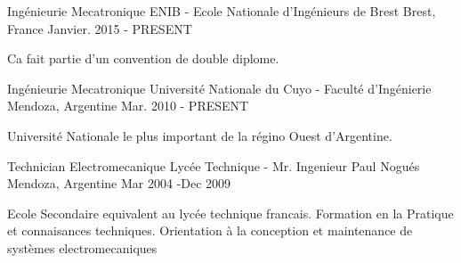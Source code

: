 

\begin{cventries}

  \cventry
    {Ingénieurie Mecatronique} %
    {ENIB - Ecole Nationale d'Ingénieurs de Brest} %
    {Brest, France} %
    {Janvier. 2015 - PRESENT} %
    {
      \begin{cvitems} %
        \item {Ca fait partie d'un convention de double diplome.}
      \end{cvitems}
    }


\cventry
{Ingénieurie Mecatronique} %
{Université Nationale du Cuyo - Faculté d'Ingénierie} %
{Mendoza, Argentine} %
{Mar. 2010 - PRESENT} %
{
	\begin{cvitems} %
		\item {Université Nationale le plus important de la régino Ouest d'Argentine.}
	\end{cvitems}
}


\cventry
{Technician Electromecanique} %
{Lycée Technique - Mr. Ingenieur Paul Nogués} %
{Mendoza, Argentine} %
{Mar 2004 -Dec 2009} %
{
	\begin{cvitems} %
		\item {Ecole Secondaire equivalent au lycée technique francais. Formation en la Pratique et connaisances techniques. Orientation à la conception et maintenance de systèmes electromecaniques}
	\end{cvitems}
}






\end{cventries}
